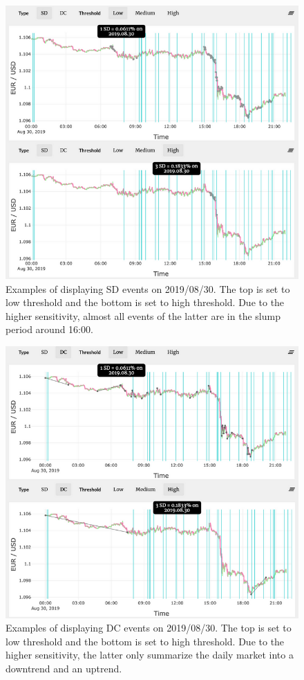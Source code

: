 \documentclass[sigconf]{acmart}
\begin{document}
\begin{figure}[h]
  \centering
  \includegraphics[width=\linewidth]{sd.png}
  \caption{Examples of displaying SD events on 2019/08/30. The top is set to low threshold and the bottom is set to high threshold. Due to the higher sensitivity, almost all events of the latter are in the slump period around 16:00.}
  \Description{}
\end{figure}

\begin{figure}[h]
  \centering
  \includegraphics[width=\linewidth]{dc.png}
  \caption{Examples of displaying DC events on 2019/08/30. The top is set to low threshold and the bottom is set to high threshold. Due to the higher sensitivity, the latter only summarize the daily market into a downtrend and an uptrend.}
  \Description{}
\end{figure}
\end{document}
